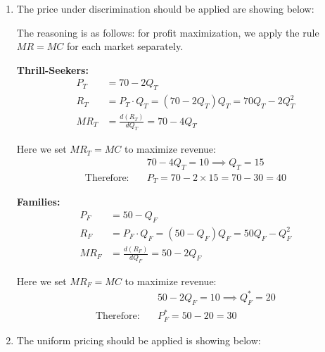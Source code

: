\documentclass[12pt]{article}
\begin{document}
\begin{enumerate}[label=(\alph*)]

\item The price under discrimination should be applied are showing below:


The reasoning is as follows:
for profit maximization, we apply the rule $MR = MC$ for each market separately.

\textbf{Thrill-Seekers:}
\begin{align*}
P_T &= 70 - 2Q_T \\
R_T &= P_T \cdot Q_T = (70 - 2Q_T)Q_T = 70Q_T - 2Q_T^2 \\
MR_T &= \frac{d(R_T)}{dQ_T} = 70 - 4Q_T
\end{align*}

Here we set $MR_T = MC$ to maximize revenue:
\begin{align*}
&70 - 4Q_T = 10 \implies Q_T = 15 \\
\text{Therefore:} \quad &P_T = 70 - 2 \times 15 = 70 - 30 = 40
\end{align*}

\textbf{Families:}
\begin{align*}
P_F &= 50 - Q_F \\
R_F &= P_F \cdot Q_F = (50 - Q_F)Q_F = 50Q_F - Q_F^2 \\
MR_F &= \frac{d(R_F)}{dQ_F} = 50 - 2Q_F
\end{align*}

Here we set $MR_F = MC$ to maximize revenue:
\begin{align*}
&50 - 2Q_F = 10 \implies Q_F^* = 20 \\
\text{Therefore:} \quad &P_F^* = 50 - 20 = 30
\end{align*}

\item The uniform pricing should be applied is showing below:



\end{enumerate}
\end{document}
